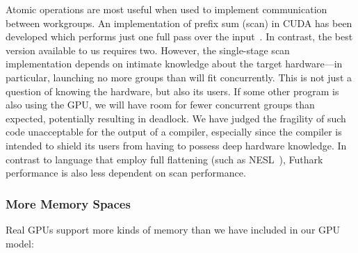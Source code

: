 Atomic operations are most useful when used to implement communication
between workgroups.  An implementation of prefix sum (scan) in CUDA
has been developed which performs just one full pass over the
input~\cite{Maleki:2016:HTM:2908080.2908089}.  In contrast, the best
version available to us requires two.  However, the single-stage scan
implementation depends on intimate knowledge about the target
hardware---in particular, launching no more groups than will fit
concurrently.  This is not just a question of knowing the hardware,
but also its users.  If some other program is also using the GPU, we
will have room for fewer concurrent groups than expected, potentially
resulting in deadlock.  We have judged the fragility of such code
unacceptable for the output of a compiler, especially since the
compiler is intended to shield its users from having to possess deep
hardware knowledge.  In contrast to language that employ full
flattening (such as NESL~\cite{BlellochCACM96NESL}), Futhark
performance is also less dependent on scan performance.

\subsubsection{More Memory Spaces}

Real GPUs support more kinds of memory than we have included in our
GPU model:

